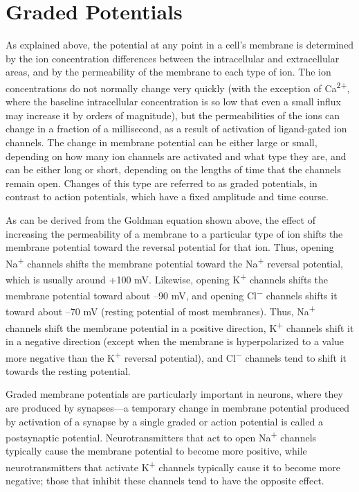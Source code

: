 \hypertarget{graded-potentials}{%
\section{Graded Potentials}\label{graded-potentials}}

As explained above, the potential at any point in a cell's membrane is determined by the ion concentration differences between the intracellular and extracellular areas, and by the permeability of the membrane to each type of ion. The ion concentrations do not normally change very quickly (with the exception of Ca\textsuperscript{2+}, where the baseline intracellular concentration is so low that even a small influx may increase it by orders of magnitude), but the permeabilities of the ions can change in a fraction of a millisecond, as a result of activation of ligand-gated ion channels. The change in membrane potential can be either large or small, depending on how many ion channels are activated and what type they are, and can be either long or short, depending on the lengths of time that the channels remain open. Changes of this type are referred to as graded potentials, in contrast to action potentials, which have a fixed amplitude and time course.

As can be derived from the Goldman equation shown above, the effect of increasing the permeability of a membrane to a particular type of ion shifts the membrane potential toward the reversal potential for that ion. Thus, opening Na\textsuperscript{+} channels shifts the membrane potential toward the Na\textsuperscript{+} reversal potential, which is usually around +100 mV. Likewise, opening K\textsuperscript{+} channels shifts the membrane potential toward about --90 mV, and opening Cl\textsuperscript{−} channels shifts it toward about --70 mV (resting potential of most membranes). Thus, Na\textsuperscript{+} channels shift the membrane potential in a positive direction, K\textsuperscript{+} channels shift it in a negative direction (except when the membrane is hyperpolarized to a value more negative than the K\textsuperscript{+} reversal potential), and Cl\textsuperscript{−} channels tend to shift it towards the resting potential.

Graded membrane potentials are particularly important in neurons, where they are produced by synapses---a temporary change in membrane potential produced by activation of a synapse by a single graded or action potential is called a postsynaptic potential. Neurotransmitters that act to open Na\textsuperscript{+} channels typically cause the membrane potential to become more positive, while neurotransmitters that activate K\textsuperscript{+} channels typically cause it to become more negative; those that inhibit these channels tend to have the opposite effect.

